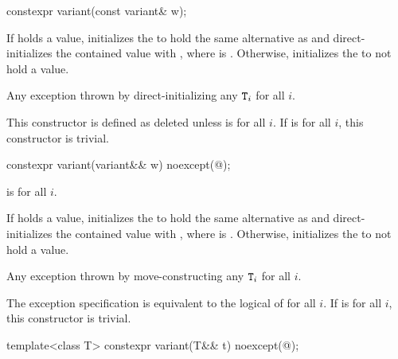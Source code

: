 %
\begin{itemdecl}
constexpr variant(const variant& w);
\end{itemdecl}

\begin{itemdescr}
\pnum
\effects
If  holds a value, initializes the  to hold the same
alternative as  and direct-initializes the contained value
with , where  is .
Otherwise, initializes the  to not hold a value.

\pnum
\throws
Any exception thrown by direct-initializing any $\texttt{\protect T}_i$ for all $i$.

\pnum
\remarks
This constructor is defined as deleted unless
 is  for all $i$.
If 
is  for all $i$, this constructor is trivial.
\end{itemdescr}

%
\begin{itemdecl}
constexpr variant(variant&& w) noexcept(@\seebelow@);
\end{itemdecl}

\begin{itemdescr}
\pnum
\constraints
{} is  for all $i$.

\pnum
\effects
If  holds a value, initializes the  to hold the same
alternative as  and direct-initializes the contained value with
, where  is .
Otherwise, initializes the  to not hold a value.

\pnum
\throws
Any exception thrown by move-constructing any $\texttt{\protect T}_i$ for all $i$.

\pnum
\remarks
The exception specification is equivalent to the logical  of
 for all $i$.
If 
is  for all $i$, this constructor is trivial.
\end{itemdescr}

%
\begin{itemdecl}
template<class T> constexpr variant(T&& t) noexcept(@\seebelow@);
\end{itemdecl}

